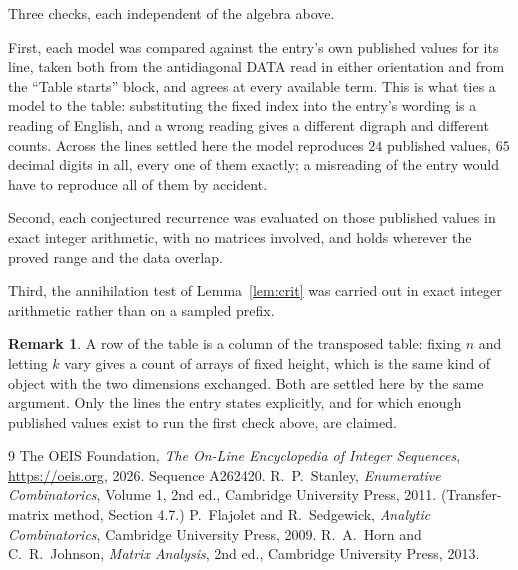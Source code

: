 \documentclass[11pt,a4paper]{article}
\theoremstyle{plain}
\theoremstyle{definition}
\newtheorem{remark}[theorem]{Remark}
\begin{document}
Three checks, each independent of the algebra above.

First, each model was compared against the entry's own published values for its line, taken
both from the antidiagonal DATA read in either orientation and from the ``Table starts''
block, and agrees at every available term. This is what ties a model to the table:
substituting the fixed index into the entry's wording is a reading of English, and a wrong
reading gives a different digraph and different counts. Across the lines settled here the
model reproduces $24$ published values, $65$ decimal digits in all, every one of
them exactly; a misreading of the entry would have to reproduce all of them by accident.

Second, each conjectured recurrence was evaluated on those published values in exact
integer arithmetic, with no matrices involved, and holds wherever the proved range and the
data overlap.

Third, the annihilation test of Lemma~\ref{lem:crit} was carried out in exact integer
arithmetic rather than on a sampled prefix.

\begin{remark}
A row of the table is a column of the transposed table: fixing $n$ and letting $k$ vary gives a
count of arrays of fixed height, which is the same kind of object with the two dimensions
exchanged. Both are settled here by the same argument. Only the lines the entry states
explicitly, and for which enough published values exist to run the first check above, are
claimed.
\end{remark}

\begin{thebibliography}{9}
 The OEIS Foundation, \emph{The On-Line Encyclopedia of Integer
Sequences}, \url{https://oeis.org}, 2026. Sequence A262420.
 R.~P.~Stanley, \emph{Enumerative Combinatorics}, Volume 1, 2nd ed.,
Cambridge University Press, 2011. (Transfer-matrix method, Section 4.7.)
 P.~Flajolet and R.~Sedgewick, \emph{Analytic Combinatorics}, Cambridge
University Press, 2009.
 R.~A.~Horn and C.~R.~Johnson, \emph{Matrix Analysis}, 2nd ed., Cambridge
University Press, 2013.
\end{thebibliography}
\end{document}
